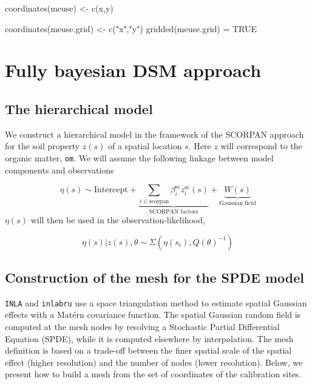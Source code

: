 \documentclass[
  a4paper,
]{article}
\newenvironment{Shaded}{\begin{snugshade}}{\end{snugshade}}
\newcommand{\ConstantTok}[1]{\textcolor[rgb]{0.56,0.35,0.01}{#1}}
\newcommand{\FunctionTok}[1]{\textcolor[rgb]{0.28,0.35,0.67}{#1}}
\newcommand{\NormalTok}[1]{\textcolor[rgb]{0.00,0.23,0.31}{#1}}
\newcommand{\OtherTok}[1]{\textcolor[rgb]{0.00,0.23,0.31}{#1}}
\newcommand{\StringTok}[1]{\textcolor[rgb]{0.13,0.47,0.30}{#1}}
\begin{document}
\begin{Shaded}
\begin{Highlighting}[]
\FunctionTok{coordinates}\NormalTok{(meuse) }\OtherTok{\textless{}{-}} \FunctionTok{c}\NormalTok{(}\StringTok{\textquotesingle{}x\textquotesingle{}}\NormalTok{,}\StringTok{\textquotesingle{}y\textquotesingle{}}\NormalTok{)}

\FunctionTok{coordinates}\NormalTok{(meuse.grid) }\OtherTok{\textless{}{-}} \FunctionTok{c}\NormalTok{(}\StringTok{"x"}\NormalTok{,}\StringTok{"y"}\NormalTok{)}
\FunctionTok{gridded}\NormalTok{(meuse.grid) }\OtherTok{=} \ConstantTok{TRUE}
\end{Highlighting}
\end{Shaded}

\hypertarget{fully-bayesian-dsm-approach}{%
\section{Fully bayesian DSM
approach}\label{fully-bayesian-dsm-approach}}

\hypertarget{the-hierarchical-model}{%
\subsection{The hierarchical model}\label{the-hierarchical-model}}

We construct a hierarchical model in the framework of the SCORPAN
approach for the soil property \(z(s)\) of a spatial location \(s\).
Here \(z\) will correspond to the organic matter, \texttt{om}. We will
assume the following linkage between model components and observations

\[
\eta(s) \sim {\text{Intercept}} + \underbrace{ \sum_{i\in \text{scorpan}}\beta^{\text{sc}}_i z^{\text{sc}}_i(s)}_{\text{SCORPAN factors} } +\underbrace{W(s)}_{\text{Gaussian field}}
\] \(\eta(s)\) will then be used in the observation-likelihood,

\[
\eta(s)|z(s) ,\theta \sim \Sigma( \eta(s_i), Q(\theta)^{-1}  )
\]

\hypertarget{construction-of-the-mesh-for-the-spde-model}{%
\subsection{Construction of the mesh for the SPDE
model}\label{construction-of-the-mesh-for-the-spde-model}}

\texttt{INLA} and \texttt{inlabru} use a space triangulation method to
estimate spatial Gaussian effects with a Matérn covariance function. The
spatial Gaussian random field is computed at the mesh nodes by resolving
a Stochastic Partial Differential Equation (SPDE), while it is computed
elsewhere by interpolation. The mesh definition is based on a trade-off
between the finer spatial scale of the spatial effect (higher
resolution) and the number of nodes (lower resolution). Below, we
present how to build a mesh from the set of coordinates of the
calibration sites.
\end{document}
